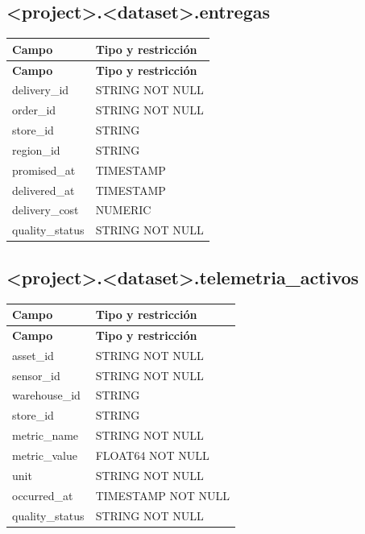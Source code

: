 \documentclass[11pt]{article}
\begin{document}
\subsection{<project>.<dataset>.entregas}

\begingroup\small
\begin{longtable}{@{}>{\raggedright\arraybackslash}p{}>{\raggedright\arraybackslash}p{}@{}}
\toprule
\textbf{Campo} & \textbf{Tipo y restricción} \\
\midrule
\endfirsthead
\toprule
\textbf{Campo} & \textbf{Tipo y restricción} \\
\midrule
\endhead
delivery\_\allowbreak{}id & STRING NOT NULL \\
order\_\allowbreak{}id & STRING NOT NULL \\
store\_\allowbreak{}id & STRING \\
region\_\allowbreak{}id & STRING \\
promised\_\allowbreak{}at & TIMESTAMP \\
delivered\_\allowbreak{}at & TIMESTAMP \\
delivery\_\allowbreak{}cost & NUMERIC \\
quality\_\allowbreak{}status & STRING NOT NULL \\
\bottomrule
\end{longtable}
\endgroup

\subsection{<project>.<dataset>.telemetria\_\allowbreak{}activos}

\begingroup\small
\begin{longtable}{@{}>{\raggedright\arraybackslash}p{}>{\raggedright\arraybackslash}p{}@{}}
\toprule
\textbf{Campo} & \textbf{Tipo y restricción} \\
\midrule
\endfirsthead
\toprule
\textbf{Campo} & \textbf{Tipo y restricción} \\
\midrule
\endhead
asset\_\allowbreak{}id & STRING NOT NULL \\
sensor\_\allowbreak{}id & STRING NOT NULL \\
warehouse\_\allowbreak{}id & STRING \\
store\_\allowbreak{}id & STRING \\
metric\_\allowbreak{}name & STRING NOT NULL \\
metric\_\allowbreak{}value & FLOAT64 NOT NULL \\
unit & STRING NOT NULL \\
occurred\_\allowbreak{}at & TIMESTAMP NOT NULL \\
quality\_\allowbreak{}status & STRING NOT NULL \\
\bottomrule
\end{longtable}
\endgroup
\end{document}
